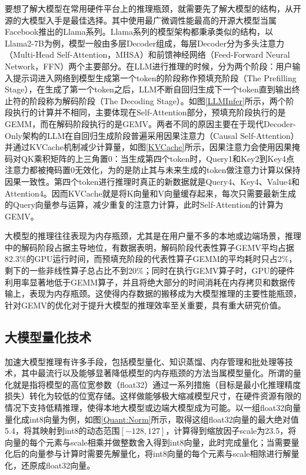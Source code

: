 要想了解大模型在常用硬件平台上的推理瓶颈，就需要先了解大模型的结构，从开源的大模型入手是最佳选择。其中使用最广微调性能最高的开源大模型当属Facebook推出的Llama系列。Llama系列的模型架构都秉承类似的结构，以Llama2-7B\cite{Llama2}为例，模型一般由多层Decoder组成，每层Decoder分为多头注意力（Multi-Head Self-Attention，MHSA）和前馈神经网络（Feed-Forward Neural Network，FFN）两个主要部分。在LLM进行推理的时候，分为两个阶段：用户输入提示词进入网络到模型生成第一个token的阶段称作预填充阶段（The Prefilling Stage），在生成了第一个token之后，LLM不断自回归生成下一个token直到输出终止符的阶段称为解码阶段（The Decoding Stage）。如图\ref{LLMInfer}所示，两个阶段执行的计算并不相同，主要体现在Self-Attention部分，预填充阶段执行的是GEMM，而在解码阶段执行的是GEMV。两者不同的原因主要在于现代Decoder-Only架构的LLM在自回归生成阶段普遍采用因果注意力（Causal Self-Attention）并通过KVCache机制减少计算量，如图\ref{KVCache}所示，因果注意力会使用因果掩码对QK乘积矩阵的上三角置0：当生成第四个token时，Query1和Key2到Key4点注意力都被掩码置0无效化，为的是防止其与未来生成的token做注意力计算以保持因果一致性。第四个token进行推理时真正的新数据就是Query4、Key4、Value4和Attention4。因而KVCache就是将K向量和V向量缓存起来，每次只需要最新生成的Query向量参与运算，减少重复的注意力计算，此时Self-Attention的计算为GEMV。

大模型的推理往往表现为内存瓶颈，尤其是在用户量不多的本地或边端场景，推理中的解码阶段占据主导地位\cite{InferLinear}，有数据表明，解码阶段代表性算子GEMV平均占据82.3\%的GPU运行时间，而预填充阶段的代表性算子GEMM的平均耗时只占2\%，剩下的一些非线性算子总占比不到20\%；同时在执行GEMV算子时，GPU的硬件利用率显著地低于GEMM算子，并且将绝大部分的时间消耗在内存拷贝和数据传输上，表现为内存瓶颈\cite{SamsungHotChips}。这使得内存数据的搬移成为大模型推理的主要性能瓶颈，针对GEMV的优化对于提升大模型的推理效率至关重要，具有重大研究价值。

\subsection{大模型量化技术}
加速大模型推理有许多手段，包括模型量化、知识蒸馏、内存管理和批处理等技术\cite{LLMInferSurveyTsingHua}，其中最流行以及能够显著降低模型的内存瓶颈的方法当属模型量化。所谓的量化就是指将模型的高位宽参数（float32）通过一系列措施（目标是最小化推理精度损失）转化为较低的位宽存储。这样做能够极大缩减模型尺寸，在硬件资源有限的情况下支持低精推理，使得本地大模型或边端大模型成为可能。以一组float32向量量化成int8向量为例，如图\ref{Quant:Norm}所示，取得这组float32向量的最大绝对值5.4，将其映射到int8的动态范围$[-128,127]$，计算得到缩放因子scale为23.5，将向量的每个元素与scale相乘并做整数舍入得到int8向量，此时完成量化；当需要量化后的向量参与计算时需要先解量化，将int8向量的每个元素与scale相除进行解量化，还原成float32向量。

